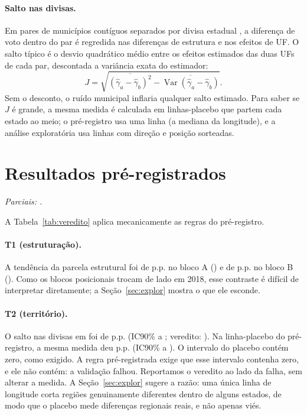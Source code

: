 \documentclass[11pt,a4paper]{article}
\begin{document}
\paragraph{Salto nas divisas.} Em pares de municípios contíguos separados por divisa estadual
\citep{keele2015}, a diferença de voto dentro do par é regredida nas diferenças de estrutura e nos
efeitos de UF. O salto típico é o desvio quadrático médio entre os efeitos estimados das duas UFs
de cada par, descontada a variância exata do estimador:
\begin{equation}
  J = \sqrt{\overline{(\hat\gamma_a - \hat\gamma_b)^2} - \overline{\operatorname{Var}(\hat\gamma_a - \hat\gamma_b)}}.
\end{equation}
Sem o desconto, o ruído municipal inflaria qualquer salto estimado. Para saber se $J$ é grande, a
mesma medida é calculada em linhas-placebo que partem cada estado ao meio; o pré-registro usa uma
linha (a mediana da longitude), e a análise exploratória usa  linhas com direção e
posição sorteadas.

\section{Resultados pré-registrados}\label{sec:prereg}

\ifparcial\noindent\emph{Parciais: \anosAnalise.}\par\fi
A Tabela~\ref{tab:veredito} aplica mecanicamente as regras do pré-registro.

\begin{table}[htbp]\centering\small
\caption{Vereditos pelas regras pré-registradas (blocos posicionais).}\label{tab:veredito}

\end{table}

\paragraph{T1 (estruturação).} A tendência da parcela estrutural foi de \tUmA{} p.p. no bloco A
(\emph{\tUmVA}) e de \tUmB{} p.p. no bloco B (\emph{\tUmVB}). Como os blocos posicionais trocam de
lado em 2018, esse contraste é difícil de interpretar diretamente; a Seção~\ref{sec:explor} mostra o
que ele esconde.

\paragraph{T2 (território).} O salto nas divisas em \anoFim{} foi de \tDoisSalto{} p.p. (IC90\%
\tDoisLo{} a \tDoisHi{}; veredito: \emph{\tDoisVeredito}). Na linha-placebo do pré-registro, a mesma
medida deu \tDoisPlacebo{} p.p. (IC90\% \tDoisPlaceboLo{} a \tDoisPlaceboHi{}).
\ifplacebook
O intervalo do placebo contém zero, como exigido.
\else
A regra pré-registrada exige que esse intervalo contenha zero, e ele não contém: a validação falhou.
Reportamos o veredito ao lado da falha, sem alterar a medida. A Seção~\ref{sec:explor} sugere a razão:
uma única linha de longitude corta regiões genuinamente diferentes dentro de alguns estados, de modo
que o placebo mede diferenças regionais reais, e não apenas viés.
\fi
\end{document}
